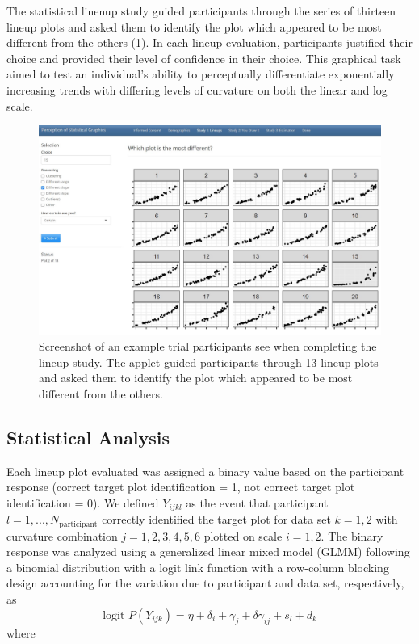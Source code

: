 \documentclass[12pt]{article}
\begin{document}
The statistical linenup study guided participants through the series of
thirteen lineup plots and asked them to identify the plot which appeared
to be most different from the others
(\cref{fig:lineup-study-example-trial}). In each lineup evaluation,
participants justified their choice and provided their level of
confidence in their choice. This graphical task aimed to test an
individual's ability to perceptually differentiate exponentially
increasing trends with differing levels of curvature on both the linear
and log scale.

\begin{figure}[tbp]

{\centering \includegraphics[width=1\linewidth,]{images/lineup-study-example-trial} 

}

\caption[Lineup study example trial]{Screenshot of an example trial participants see when completing the lineup study. The applet guided participants through 13 lineup plots and asked them to identify the plot which appeared to be most different from the others.}\label{fig:lineup-study-example-trial}
\end{figure}

\hypertarget{statistical-analysis}{%
\subsection{Statistical Analysis}\label{statistical-analysis}}

Each lineup plot evaluated was assigned a binary value based on the
participant response (correct target plot identification = 1, not
correct target plot identification = 0). We defined \(Y_{ijkl}\) as the
event that participant \(l = 1,...,N_\text{participant}\) correctly
identified the target plot for data set \(k = 1,2\) with curvature
combination \(j = 1,2,3,4,5,6\) plotted on scale \(i = 1,2\). The binary
response was analyzed using a generalized linear mixed model (GLMM)
following a binomial distribution with a logit link function with a
row-column blocking design accounting for the variation due to
participant and data set, respectively, as \begin{equation}
\text{logit }P(Y_{ijk}) = \eta + \delta_i + \gamma_j + \delta \gamma_{ij} + s_l + d_k
\end{equation} \noindent where
\end{document}
